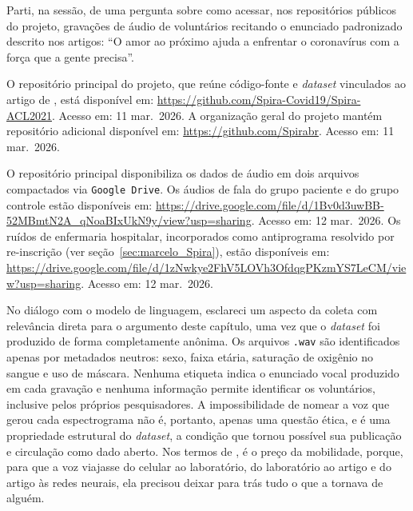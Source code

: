 Parti, na sessão, de uma pergunta sobre como acessar, nos repositórios públicos do projeto, gravações de áudio de voluntários recitando o enunciado padronizado descrito nos artigos: \enquote{O amor ao próximo ajuda a enfrentar o coronavírus com a força que a gente precisa}.

O repositório principal do projeto, que reúne código-fonte e \textit{dataset} vinculados ao artigo de \textcite{Casanova2021DeepLearning}, está disponível em: \url{https://github.com/Spira-Covid19/Spira-ACL2021}. Acesso em: 11 mar.~2026. A organização geral do projeto mantém repositório adicional disponível em: \url{https://github.com/Spirabr}. Acesso em: 11 mar.~2026.

O repositório principal disponibiliza os dados de áudio em dois arquivos compactados via \texttt{Google Drive}. Os áudios de fala do grupo paciente e do grupo controle estão disponíveis em: \url{https://drive.google.com/file/d/1Bv0d3uwBB-52MBmtN2A_qNoaBIxUkN9y/view?usp=sharing}. Acesso em: 12 mar.~2026. Os ruídos de enfermaria hospitalar, incorporados como antiprograma resolvido por re-inscrição (ver seção~\ref{sec:marcelo_Spira}), estão disponíveis em: \url{https://drive.google.com/file/d/1zNwkye2FhV5LOVh3OfdqgPKzmYS7LeCM/view?usp=sharing}. Acesso em: 12 mar.~2026.

No diálogo com o modelo de linguagem, esclareci um aspecto da coleta com relevância direta para o argumento deste capítulo, uma vez que o \textit{dataset} foi produzido de forma completamente anônima. Os arquivos \texttt{.wav} são identificados apenas por metadados neutros: sexo, faixa etária, saturação de oxigênio no sangue e uso de máscara. Nenhuma etiqueta indica o enunciado vocal produzido em cada gravação e nenhuma informação permite identificar os voluntários, inclusive pelos próprios pesquisadores. A impossibilidade de nomear a voz que gerou cada espectrograma não é, portanto, apenas uma questão ética, e é uma propriedade estrutural do \textit{dataset}, a condição que tornou possível sua publicação e circulação como dado aberto. Nos termos de \textcite{Latour2017Esperanca}, é o preço da mobilidade, porque, para que a voz viajasse do celular ao laboratório, do laboratório ao artigo e do artigo às redes neurais, ela precisou deixar para trás tudo o que a tornava de alguém.

